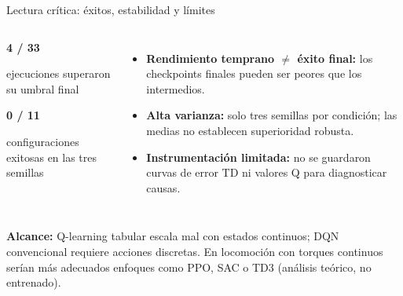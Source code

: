 \documentclass[aspectratio=169,10pt]{beamer}
\begin{document}
\begin{frame}{Lectura crítica: éxitos, estabilidad y límites}
\begin{columns}[T,onlytextwidth]
\begin{takeaway}\centering
{\color{Blue}\fontsize{30}{32}\selectfont\bfseries 4 / 33}\par
\small ejecuciones superaron su umbral final\par\vspace{.20cm}
{\color{Warn}\Large\bfseries 0 / 11}\par
\small configuraciones exitosas en las tres semillas
\end{takeaway}
\begin{itemize}\setlength{\itemsep}{.14cm}
\item \textbf{Rendimiento temprano $\neq$ éxito final:} los checkpoints finales pueden ser peores que los intermedios.
\item \textbf{Alta varianza:} solo tres semillas por condición; las medias no establecen superioridad robusta.
\item \textbf{Instrumentación limitada:} no se guardaron curvas de error TD ni valores Q para diagnosticar causas.
\end{itemize}
\end{columns}
\vspace{.16cm}
\begin{info}\small\textbf{Alcance:} Q-learning tabular escala mal con estados continuos; DQN convencional requiere acciones discretas. En locomoción con torques continuos serían más adecuados enfoques como PPO, SAC o TD3 (análisis teórico, no entrenado).\end{info}
\end{frame}
\end{document}
